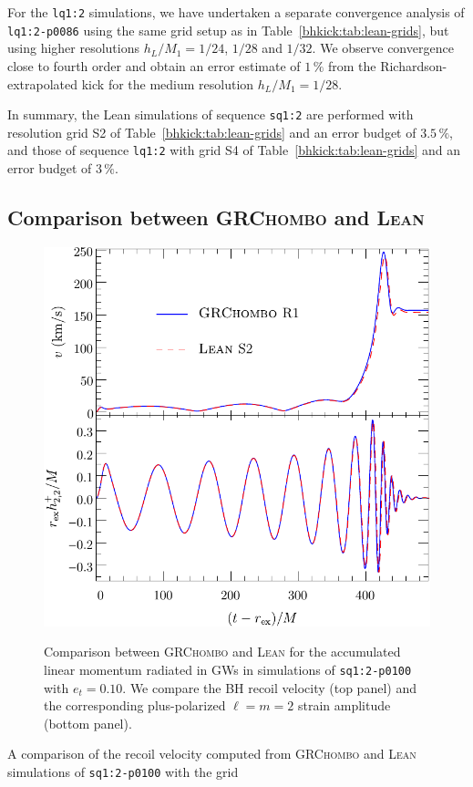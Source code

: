 For the \texttt{lq1:2} simulations, we have undertaken a separate
convergence analysis of \texttt{lq1:2-p0086} using the same grid
setup as in
Table~\ref{bhkick:tab:lean-grids}, but using higher resolutions
$h_L/M_1=1/24$, $1/28$ and $1/32$. We observe convergence close to
fourth order and obtain an error estimate of $1\,\%$ from
the Richardson-extrapolated kick for the medium resolution
$h_L/M_1=1/28$.

In summary, the {\sc Lean} simulations of sequence \texttt{sq1:2} are
performed with resolution grid S2 of Table~\ref{bhkick:tab:lean-grids} and an
error budget of $3.5\,\%$, and those of sequence \texttt{lq1:2} with
grid S4 of Table~\ref{bhkick:tab:lean-grids} and an error budget of $3\,\%$.

\subsection{Comparison between \textsc{GRChombo} and \textsc{Lean}}
\label{bhkick:sec:code-comparison}
\begin{figure}[t]
    {
    \centering
    \includegraphics[width=0.7\columnwidth]{bhkick/grchombo-lean-comparison3.pdf}
    }
    \caption{Comparison between \textsc{GRChombo} and \textsc{Lean}
    for the accumulated linear momentum radiated in GWs in simulations
    of \texttt{sq1:2-p0100} with $e_t=0.10$.
    We compare the BH recoil velocity (top panel)
    and the corresponding plus-polarized $\ell=m=2$ strain
    amplitude (bottom panel).
    }
    \label{bhkick:fig:grchombo-lean-comparison}
\end{figure}
A comparison of the recoil velocity computed from \textsc{GRChombo}
and \textsc{Lean} simulations of \texttt{sq1:2-p0100} with the grid
